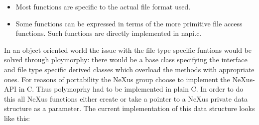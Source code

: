 \documentclass[a4paper]{article}
\begin{document}
\begin{itemize}\item Most functions are specific to the actual file format used.
\item Some functions can be expressed in terms of the more primitive file 
 access functions. Such functions are directly implemented in napi.c.
\end{itemize}In an object oriented world the issue with the file type specific funtions would 
be solved through ploymorphy: there would be a base class specifying the interface and 
file type specific derived classes  which overload the methods with appropriate ones.
For reasons of portability the NeXus group choose to implement the NeXus-API in C. Thus 
polymoprhy had to be implemented in plain C. In order to do this all NeXus functions 
either create or take a pointer to a NeXus private data structure as a parameter. 
The current implementation of this data structure looks like this:
\end{document}
